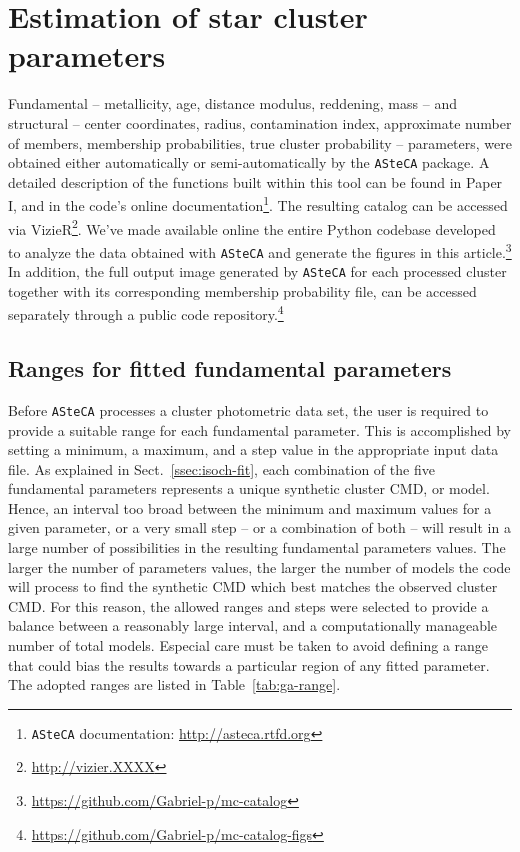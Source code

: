 \documentclass[draft]{aa}
\begin{document}

\section{Estimation of star cluster parameters}
\label{sec:fund-params}

Fundamental -- metallicity, age, distance modulus, reddening, mass -- and
structural -- center coordinates, radius, contamination index, approximate
number of members, membership probabilities, true cluster probability --
parameters, were obtained either automatically or semi-automatically by the
\texttt{ASteCA} package.
%
A detailed description of the functions built within this tool can be found in
Paper I, and in the code's online documentation\footnote{\texttt{ASteCA}
documentation: \url{http://asteca.rtfd.org}}.
%
The resulting catalog can be accessed via
VizieR\footnote{\url{http://vizier.XXXX}}.
We've made available online the entire Python codebase developed to analyze
the data obtained with \texttt{ASteCA} and generate the figures in this
article.\footnote{\url{https://github.com/Gabriel-p/mc-catalog}}
%
In addition, the full output image generated by \texttt{ASteCA} for each
processed cluster together with its corresponding membership probability file,
can be accessed separately through a public code
repository.\footnote{\url{https://github.com/Gabriel-p/mc-catalog-figs}}



\subsection{Ranges for fitted fundamental parameters}
\label{ssec:param-ranges}

Before \texttt{ASteCA} processes a cluster photometric data set, the user is
required to provide a suitable range for each fundamental parameter. This is
accomplished by setting a minimum, a maximum, and a step value in the
appropriate input data file.
%
As explained in Sect.~\ref{ssec:isoch-fit}, each combination of the five
fundamental parameters represents a unique synthetic cluster CMD, or model.
%
Hence, an interval too broad between the minimum and maximum
values for a given parameter, or a very small step -- or a combination of
both -- will result in a large number of possibilities in the resulting
fundamental parameters values.
%
The larger the number of parameters values, the larger the number of models the
code will process to find the synthetic CMD which best matches the observed
cluster CMD.\@
%
For this reason, the allowed ranges and steps were selected to provide
a balance between a reasonably large interval, and a computationally manageable
number of total models.
Especial care must be taken to avoid defining a range that could bias the
results towards a particular region of any fitted parameter.
The adopted ranges are listed in Table~\ref{tab:ga-range}.\\
\end{document}
